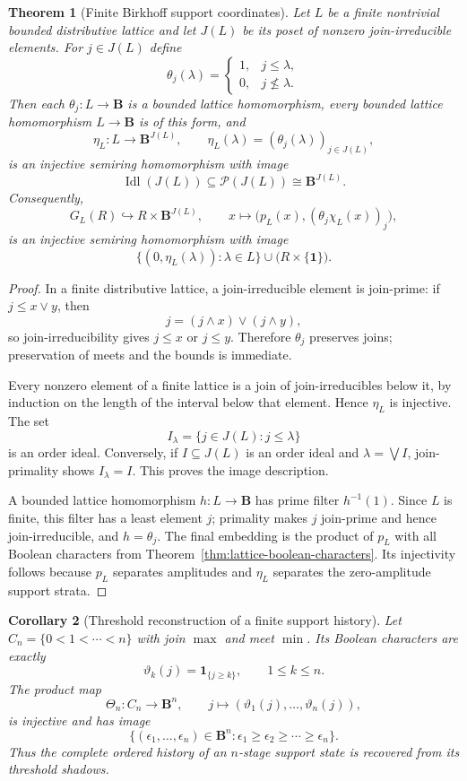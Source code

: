 \documentclass[11pt]{amsart}
\numberwithin{equation}{section}
\newtheorem{theorem}{Theorem}[section]
\newtheorem{corollary}[theorem]{Corollary}
\theoremstyle{definition}
\newcommand{\B}{\mathbf B}
\begin{document}
\begin{theorem}[Finite Birkhoff support coordinates]
\label{thm:birkhoff-support-coordinates}
Let $L$ be a finite nontrivial bounded distributive lattice and let $J(L)$ be its
poset of nonzero join-irreducible elements.  For $j\in J(L)$ define
\[
\theta_j(\lambda)=
\begin{cases}
1,&j\leq\lambda,\\
0,&j\nleq\lambda.
\end{cases}
\]
Then each $\theta_j:L\to\B$ is a bounded lattice homomorphism, every
bounded lattice homomorphism $L\to\B$ is of this form, and
\[
\eta_L:L\longrightarrow\B^{J(L)},
\qquad
\eta_L(\lambda)=(\theta_j(\lambda))_{j\in J(L)},
\]
is an injective semiring homomorphism with image
\[
\operatorname{Idl}(J(L))
\subseteq\mathcal P(J(L))\cong\B^{J(L)}.
\]
Consequently,
\[
\boxed{
G_L(R)\hookrightarrow R\times\B^{J(L)},
\qquad
x\longmapsto\bigl(p_L(x),(\theta_j\chi_L(x))_j\bigr),
}
\]
is an injective semiring homomorphism with image
\[
\{(0,\eta_L(\lambda)):\lambda\in L\}
\cup
\bigl(R\times\{\mathbf1\}\bigr).
\]
\end{theorem}

\begin{proof}
In a finite distributive lattice, a join-irreducible element is join-prime:
if $j\leq x\vee y$, then
\[
j=(j\wedge x)\vee(j\wedge y),
\]
so join-irreducibility gives $j\leq x$ or $j\leq y$.  Therefore
$\theta_j$ preserves joins; preservation of meets and the bounds is
immediate.

Every nonzero element of a finite lattice is a join of join-irreducibles
below it, by induction on the length of the interval below that element.
Hence $\eta_L$ is injective.  The set
\[
I_\lambda=\{j\in J(L):j\leq\lambda\}
\]
is an order ideal.  Conversely, if $I\subseteq J(L)$ is an order ideal and
$\lambda=\bigvee I$, join-primality shows
$I_\lambda=I$.  This proves the image description.

A bounded lattice homomorphism $h:L\to\B$ has prime filter
$h^{-1}(1)$.  Since $L$ is finite, this filter has a least element $j$;
primality makes $j$ join-prime and hence join-irreducible, and
$h=\theta_j$.  The final embedding is the product of $p_L$ with all
Boolean characters from Theorem~\ref{thm:lattice-boolean-characters}.
Its injectivity follows because $p_L$ separates amplitudes and $\eta_L$
separates the zero-amplitude support strata.
\end{proof}

\begin{corollary}[Threshold reconstruction of a finite support history]
\label{cor:chain-threshold-reconstruction}
Let $C_n=\{0<1<\cdots<n\}$ with join $\max$ and meet $\min$.  Its Boolean
characters are exactly
\[
\vartheta_k(j)=\mathbf1_{\{j\geq k\}},
\qquad 1\leq k\leq n.
\]
The product map
\[
\Theta_n:C_n\longrightarrow\B^n,
\qquad
j\longmapsto
(\vartheta_1(j),\ldots,\vartheta_n(j)),
\]
is injective and has image
\[
\{(\epsilon_1,\ldots,\epsilon_n)\in\B^n:
\epsilon_1\geq\epsilon_2\geq\cdots\geq\epsilon_n\}.
\]
Thus the complete ordered history of an $n$-stage support state is recovered
from its threshold shadows.
\end{corollary}
\end{document}
